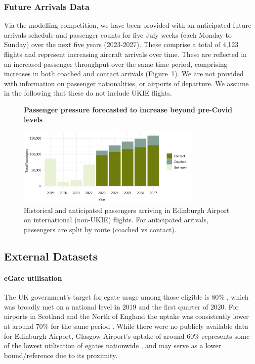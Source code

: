 \documentclass[10pt]{article}
\newcommand*{\figuretitle}[1]{%
    {\centering%
    \textbf{#1}%
    \par\medskip}%
}
\begin{document}
\subsubsection{Future Arrivals Data} \label{sec:future_arrivals_data}
Via the modelling competition, we have been provided with an anticipated future arrivals schedule and passenger counts for five July weeks (each Monday to Sunday) over the next five years (2023-2027). These comprise a total of 4,123 flights and represent increasing aircraft arrivals over time. These are reflected in an increased passenger throughput over the same time period, comprising increases in both coached and contact arrivals (Figure~\ref{fig:future_passenger_burden}). We are not provided with information on passenger nationalities, or airports of departure. We assume in the following that these do not include UKIE flights. 

% 


\begin{figure}[!ht]
    \centering
    \figuretitle{Passenger pressure forecasted to increase beyond pre-Covid levels}
    \includegraphics[width=0.8\textwidth]{figures/future_passenger_burden_fig.png}
     \caption{
     Historical and anticipated passengers arriving in Edinburgh Airport on international (non-UKIE) flights. For anticipated arrivals, passengers are split by route (coached vs contact).} \label{fig:future_passenger_burden}
\end{figure}

\subsection{External Datasets} \label{sec:observed_arrivals_data}

\paragraph{eGate utilisation}
The UK government's target for \gls{egate} usage among those eligible is 80\% \cite{UK_border_2025}, which was broadly met on a national level in 2019 and the first quarter of 2020. For airports in Scotland and the North of England the uptake was consistently lower at around 70\% for the same period \cite{Inspection_eGates}. While there were no publicly available data for Edinburgh Airport, Glasgow Airport's uptake of around 60\% represents some of the lowest utilisation of \glspl{egate} nationwide \cite{Inspection_eGates}, and may serve as a lower bound/reference due to its proximity.
\end{document}
